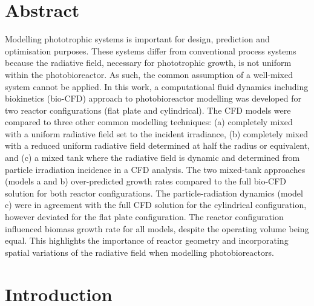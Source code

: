 \section*{Abstract}
Modelling phototrophic systems is important for design, prediction and optimisation purposes. These systems differ from conventional process systems because the radiative field, necessary for phototrophic growth, is not uniform within the photobioreactor. As such, the common assumption of a well-mixed system cannot be applied. In this work, a computational fluid dynamics including biokinetics (bio-CFD) approach to photobioreactor modelling was developed for two reactor configurations (flat plate and cylindrical). The CFD models were compared to three other common modelling techniques: (a) completely mixed with a uniform radiative field set to the incident irradiance, (b) completely mixed with a reduced uniform radiative field determined at half the radius or equivalent, and (c) a mixed tank where the radiative field is dynamic and determined from particle irradiation incidence in a CFD analysis. The two mixed-tank approaches (models a and b) over-predicted growth rates compared to the full bio-CFD solution for both reactor configurations. The particle-radiation dynamics (model c) were in agreement with the full CFD solution for the cylindrical configuration, however deviated for the flat plate configuration. The reactor configuration influenced biomass growth rate for all models, despite the operating volume being equal. This highlights the importance of reactor geometry and incorporating spatial variations of the radiative field when modelling photobioreactors.
\section{Introduction}
\label{sec:ch3_intro}	%

